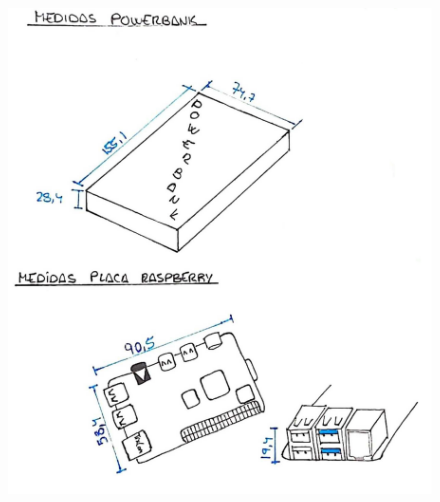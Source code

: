 \begin{figure}[ht!]
	\centering
	\begin{minipage}{0.45\linewidth}
		\centering
		\includegraphics[width=\linewidth]{figs/cap5/planos1.jpeg}
		\caption*{\centering}
	\end{minipage}
	\hspace{1cm}
	\begin{minipage}{0.45\linewidth}
		\centering

\end{minipage}
\end{figure}

